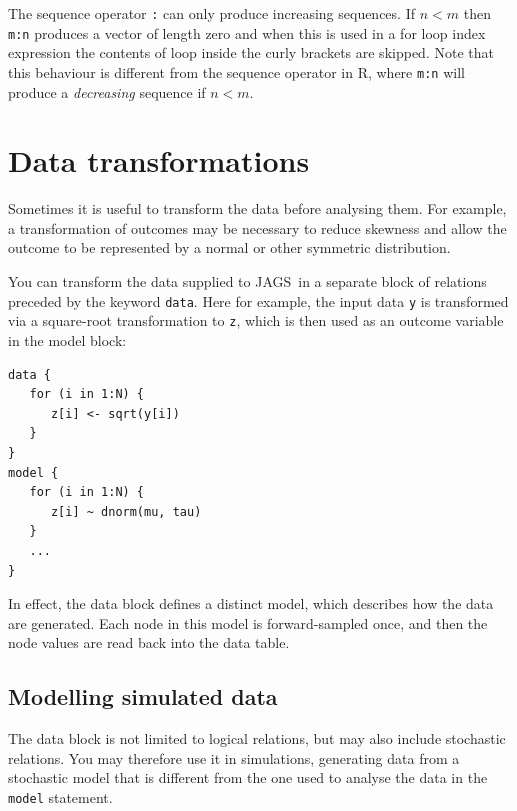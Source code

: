 \documentclass[11pt, a4paper, titlepage]{report}
\newcommand{\JAGS}{\textsf{JAGS}}
\begin{document}
The sequence operator \verb+:+ can only produce increasing
sequences. If $n < m$ then \verb+m:n+ produces a vector of length zero
and when this is used in a for loop index expression the contents of
loop inside the curly brackets are skipped. Note that this behaviour
is different from the sequence operator in R, where \verb+m:n+ will
produce a {\em decreasing} sequence if $n < m$.

\section{Data transformations}
\label{section:data:tranformations}

Sometimes it is useful to transform the data before analysing them.
For example, a transformation of outcomes may be necessary to
reduce skewness and allow the outcome to be represented by a normal
or other symmetric distribution.

You can transform the data supplied to \JAGS\ in a separate block of
relations preceded by the keyword \texttt{data}. Here for example,
the input data \texttt{y} is transformed via a square-root transformation
to \texttt{z}, which is then used as an outcome variable in the model block:
\begin{verbatim}
data {
   for (i in 1:N) {
      z[i] <- sqrt(y[i])
   }
}
model {
   for (i in 1:N) {
      z[i] ~ dnorm(mu, tau)
   }
   ...
}
\end{verbatim}
In effect, the data block defines a distinct model, which describes
how the data are generated. Each node in this model is forward-sampled
once, and then the node values are read back into the data table.

\subsection{Modelling simulated data}

The data block is not limited to logical relations, but may also
include stochastic relations. You may therefore use it in simulations,
generating data from a stochastic model that is different from the one
used to analyse the data in the \texttt{model} statement.
\end{document}
